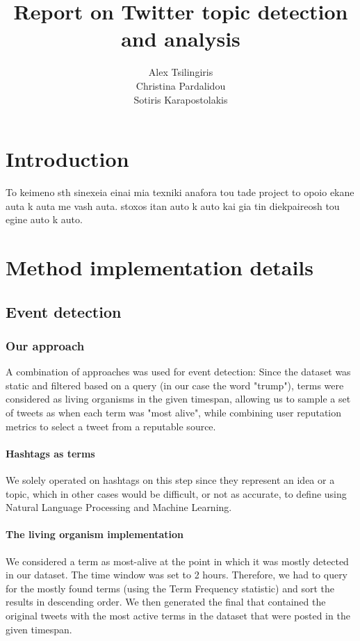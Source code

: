 \documentclass[12pt,svgnames]{report}
\title{\color{mycolor}Report on Twitter topic detection and analysis}
\author{
Alex Tsilingiris \\
Christina Pardalidou \\
Sotiris Karapostolakis \\
}
\begin{document}
\maketitle
\begingroup
\color{mycolor}
\tableofcontents
\endgroup
\chapter{Introduction}
To keimeno sth sinexeia einai mia texniki anafora tou tade project to opoio ekane auta k auta me vash auta. stoxos itan auto k auto kai gia tin diekpaireosh tou egine auto k auto.

\chapter{Method implementation details}
\section*{Event detection}
\subsection*{Our approach}
A combination of approaches was used for event detection: Since the dataset was static and filtered based on a query (in our case the word "trump"), terms were considered as living organisms in the given timespan, allowing us to sample a set of tweets as when each term was "most alive", while combining user reputation metrics to select a tweet from a reputable source.
\subsubsection*{Hashtags as terms}
We solely operated on hashtags on this step since they represent an idea or a topic, which in other cases would be difficult, or not as accurate, to define using Natural Language Processing and Machine Learning.
\subsubsection*{The living organism implementation}
We considered a term as most-alive at the point in which it was mostly detected in our dataset. The time window was set to 2 hours. Therefore, we had to query for the mostly found terms (using the Term Frequency statistic) and sort the results in descending order. We then generated the final that contained the original tweets with the most active terms in the dataset that were posted in the given timespan.
\end{document}
